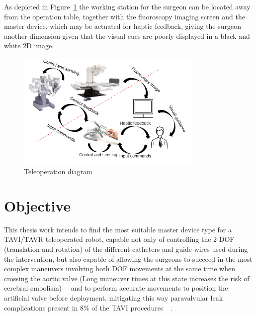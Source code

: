 As depicted in Figure~\ref{img:teleoperation} the working station for the surgeon can be located away from the operation table, together with the fluoroscopy imaging screen and the master device, which may be actuated for haptic feedback, giving the surgeon another dimension given that the visual cues are poorly displayed in a black and white 2D image.\\

\begin{figure}[ht]
   \centering
   \includegraphics[width=0.8\textwidth]{img/teleoperation.PNG}
   \caption{Teleoperation diagram}
   \label{img:teleoperation}
\end{figure}

\section{Objective}\label{sec:objective}

This thesis work intends to find the most suitable master device type for a TAVI/TAVR teleoperated robot, capable not only of controlling the 2 DOF (translation and rotation) of the different catheters and guide wires used during the intervention, but also capable of allowing the surgeons to succeed in the most complex maneuvers involving both DOF movements at the same time when crossing the aortic valve (Long maneuver times at this state increases the risk of cerebral embolism)~\cite{raptech}~\cite{anatomic} and to perform accurate movements to position the artificial valve before deployment, mitigating this way paravalvular leak complications present in 8\% of the TAVI procedures~\cite{pvl}~\cite{pvl2}.\\

